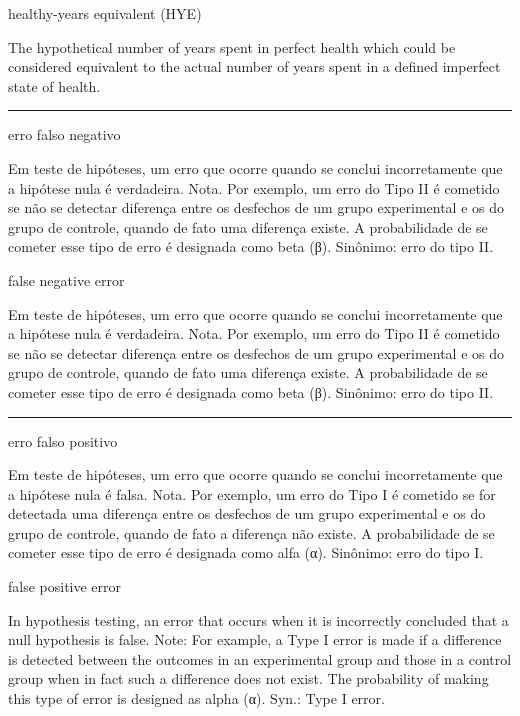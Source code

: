 \documentclass[
  openany]{book}
\begin{document}
healthy-years equivalent (HYE)

The hypothetical number of years spent in perfect health which could be considered equivalent to the actual number of years spent in a defined imperfect state of health.

\begin{center}\rule{0.5\linewidth}{0.5pt}\end{center}

erro falso negativo

Em teste de hipóteses, um erro que ocorre quando se conclui incorretamente que a hipótese nula é verdadeira. Nota. Por exemplo, um erro do Tipo II é cometido se não se detectar diferença entre os desfechos de um grupo experimental e os do grupo de controle, quando de fato uma diferença existe. A probabilidade de se cometer esse tipo de erro é designada como beta (β). Sinônimo: erro do tipo II.

false negative error

Em teste de hipóteses, um erro que ocorre quando se conclui incorretamente que a hipótese nula é verdadeira. Nota. Por exemplo, um erro do Tipo II é cometido se não se detectar diferença entre os desfechos de um grupo experimental e os do grupo de controle, quando de fato uma diferença existe. A probabilidade de se cometer esse tipo de erro é designada como beta (β). Sinônimo: erro do tipo II.

\begin{center}\rule{0.5\linewidth}{0.5pt}\end{center}

erro falso positivo

Em teste de hipóteses, um erro que ocorre quando se conclui incorretamente que a hipótese nula é falsa. Nota. Por exemplo, um erro do Tipo I é cometido se for detectada uma diferença entre os desfechos de um grupo experimental e os do grupo de controle, quando de fato a diferença não existe. A probabilidade de se cometer esse tipo de erro é designada como alfa (α). Sinônimo: erro do tipo I.

false positive error

In hypothesis testing, an error that occurs when it is incorrectly concluded that a null hypothesis is false. Note: For example, a Type I error is made if a difference is detected between the outcomes in an experimental group and those in a control group when in fact such a difference does not exist. The probability of making this type of error is designed as alpha (α). Syn.: Type I error.
\end{document}
